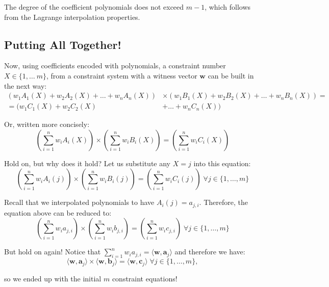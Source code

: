 \documentclass[../lecture-notes.tex]{subfiles}
\begin{document}
\begin{remark}
    The degree of the coefficient polynomials does not exceed $m - 1$, which follows from the Lagrange interpolation properties.
\end{remark}

\subsection{Putting All Together!}

Now, using coefficients encoded with polynomials, a constraint number $X \in \{1, \dots\ m\}$, from
a constraint system with a witness vector $\mathbf{w}$ can be built in the next way:
\begin{align*}
    (w_1A_1(X) + w_2A_2(X) + \dots + w_nA_n(X)) &\times (w_1B_1(X) + w_2B_2(X) + \dots + w_nB_n(X)) =\\ = (w_1C_1(X) + w_2C_2(X)& + \dots + w_nC_n(X))
\end{align*}

Or, written more concisely:
\begin{equation*}
    \left( \sum_{i = 1}^{n} w_iA_i(X) \right) \times \left( \sum_{i = 1}^{n} w_iB_i(X) \right) = \left( \sum_{i = 1}^{n} w_iC_i(X) \right)
\end{equation*}

\begin{remark}
    Hold on, but why does it hold? Let us substitute any $X=j$ into this equation:
    \begin{equation*}
        \left( \sum_{i = 1}^{n} w_iA_i(j) \right) \times \left( \sum_{i = 1}^{n} w_iB_i(j) \right) = \left( \sum_{i = 1}^{n} w_iC_i(j) \right) \; \forall j \in \{1,\dots,m\}
    \end{equation*}

    Recall that we interpolated polynomials to have $A_i(j) = a_{j,i}$. Therefore, the equation above can be reduced to:
    \begin{equation*}
        \left( \sum_{i = 1}^{n} w_ia_{j,i} \right) \times \left( \sum_{i = 1}^{n} w_ib_{j,i} \right) = \left( \sum_{i = 1}^{n} w_ic_{j,i} \right) \; \forall j \in \{1,\dots,m\}
    \end{equation*}

    But hold on again! Notice that $\sum_{i = 1}^{n} w_ia_{j,i} = \langle \mathbf{w}, \mathbf{a}_j \rangle$ and therefore we have:
    \begin{equation*}
        \langle \mathbf{w}, \mathbf{a}_j \rangle \times \langle \mathbf{w}, \mathbf{b}_j \rangle = \langle \mathbf{w}, \mathbf{c}_j \rangle \; \forall j \in \{1,\dots,m\},
    \end{equation*}
    
    so we ended up with the initial $m$ constraint equations!
\end{remark}
\end{document}
